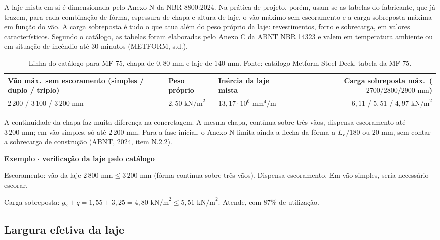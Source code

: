 \documentclass[11pt,a4paper]{article}
\newcommand{\caixaexemplo}[2]{%
  \par\vspace{6pt}\noindent\colorbox{examplebg}{%
    \parbox{\dimexpr\linewidth-2\fboxsep\relax}{%
      \vspace{4pt}\textbf{\color{exampleaccent}#1}\par\vspace{3pt}#2\vspace{4pt}%
    }%
  }\par\vspace{6pt}%
}
\begin{document}
A laje mista em si é dimensionada pelo Anexo N da NBR 8800:2024. Na prática de projeto, porém, usam-se as tabelas do fabricante, que já trazem, para cada combinação de fôrma, espessura de chapa e altura de laje, o vão máximo sem escoramento e a carga sobreposta máxima em função do vão. A carga sobreposta é tudo o que atua além do peso próprio da laje: revestimentos, forro e sobrecarga, em valores característicos. Segundo o catálogo, as tabelas foram elaboradas pelo Anexo C da ABNT NBR 14323 e valem em temperatura ambiente ou em situação de incêndio até $30$ minutos (METFORM, s.d.).

\begin{table}[!htbp]
  \centering
  \caption{Linha do catálogo para MF-75, chapa de $0{,}80\text{ mm}$ e laje de $140\text{ mm}$. Fonte: catálogo Metform Steel Deck, tabela da MF-75.}
  \label{tab:catalogo-mf75}
  \small
  \begin{tabularx}{\linewidth}{Xllr}
    \toprule
    \textbf{Vão máx.\ sem escoramento (simples / duplo / triplo)} & \textbf{Peso próprio} & \textbf{Inércia da laje mista} & \textbf{Carga sobreposta máx.\ ($2700 / 2800 / 2900\text{ mm}$)} \\
    \midrule
    $2\,200$ / $3\,100$ / $3\,200\text{ mm}$ & $2{,}50\text{ kN/m}^2$ & $13{,}17\cdot 10^6\text{ mm}^4/\text{m}$ & $6{,}11$ / $5{,}51$ / $4{,}97\text{ kN/m}^2$ \\
    \bottomrule
  \end{tabularx}
\end{table}

A continuidade da chapa faz muita diferença na concretagem. A mesma chapa, contínua sobre três vãos, dispensa escoramento até $3\,200\text{ mm}$; em vão simples, só até $2\,200\text{ mm}$. Para a fase inicial, o Anexo N limita ainda a flecha da fôrma a $L_F/180$ ou $20\text{ mm}$, sem contar a sobrecarga de construção (ABNT, 2024, item N.2.2).

\caixaexemplo{Exemplo $\cdot$ verificação da laje pelo catálogo}{%
Escoramento: vão da laje $2\,800\text{ mm} \le 3\,200\text{ mm}$ (fôrma contínua sobre três vãos). Dispensa escoramento. Em vão simples, seria necessário escorar.\par
Carga sobreposta: $g_2 + q = 1{,}55 + 3{,}25 = 4{,}80\text{ kN/m}^2 \le 5{,}51\text{ kN/m}^2$. Atende, com $87\%$ de utilização.}

\subsection{Largura efetiva da laje}
\end{document}
